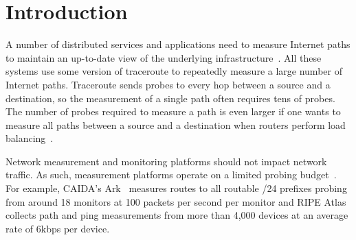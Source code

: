 \section{Introduction}
\label{sec:intro}


A number of distributed services and applications need to measure
Internet paths to maintain an up-to-date view of the underlying
infrastructure~\cite{duffield06binary, dhamdhere07netdiagnoser,
kompella07blackholes, bassett12lifeguard, akamai, skitter}.  All these
systems use some version of traceroute to repeatedly measure a large
number of Internet paths.  Traceroute sends probes to every hop between
a source and a destination, so the measurement of a single path often
requires tens of probes.  The number of probes required to measure a
path is even larger if one wants to measure all paths between a source
and a destination when routers perform load
balancing~\cite{veitch09balancer}.

Network measurement and monitoring platforms should not impact
network traffic.  As such, measurement platforms operate on a limited
probing budget~\cite{shavitt09dimes, skitter, ripeatlas, chen09ono}.
For example, CAIDA's Ark~\cite{skitter} measures routes to all routable
/24 prefixes probing from around 18 monitors at 100 packets per second
per monitor and RIPE Atlas~\cite{ripeatlas} collects path and ping
measurements from more than 4,000 devices at an average rate of 6kbps
per device.

